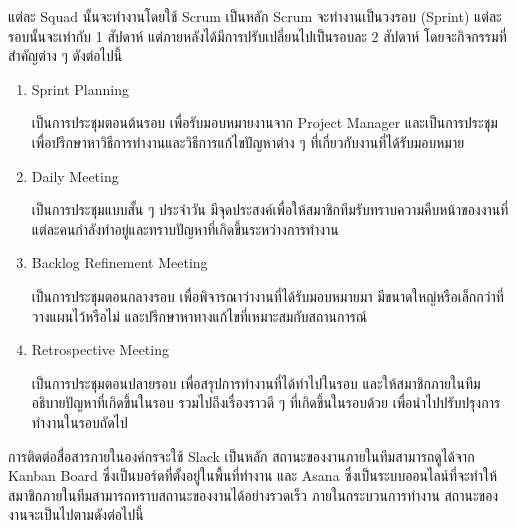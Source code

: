 แต่ละ Squad นั้นจะทำงานโดยใช้ Scrum เป็นหลัก Scrum จะทำงานเป็นวงรอบ (Sprint) แต่ละรอบนั้นจะเท่ากับ 1 สัปดาห์ แต่ภายหลังได้มีการปรับเปลี่ยนไปเป็นรอบละ 2 สัปดาห์ โดยจะกิจกรรมที่สำคัญต่าง ๆ ดังต่อไปนี้
\begin{enumerate}
	\item Sprint Planning
	
	เป็นการประชุมตอนต้นรอบ เพื่อรับมอบหมายงานจาก Project Manager และเป็นการประชุมเพื่อปรึกษาหาวิธีการทำงานและวิธีการแก้ไขปัญหาต่าง ๆ ที่เกี่ยวกับงานที่ได้รับมอบหมาย
	
	\item Daily Meeting
	
	เป็นการประชุมแบบสั้น ๆ ประจำวัน มีจุดประสงค์เพื่อให้สมาชิกทีมรับทราบความคืบหน้าของงานที่แต่ละคนกำลังทำอยู่และทราบปัญหาที่เกิดขึ้นระหว่างการทำงาน
	
	\item Backlog Refinement Meeting
	
	เป็นการประชุมตอนกลางรอบ เพื่อพิจารณาว่างานที่ได้รับมอบหมายมา มีขนาดใหญ่หรือเล็กกว่าที่วางแผนไว้หรือไม่ และปรึกษาหาทางแก้ไขที่เหมาะสมกับสถานการณ์
	
	\item Retrospective Meeting
	
	เป็นการประชุมตอนปลายรอบ เพื่อสรุปการทำงานที่ได้ทำไปในรอบ และให้สมาชิกภายในทีมอธิบายปัญหาที่เกิดขึ้นในรอบ รวมไปถึงเรื่องราวดี ๆ ที่เกิดขึ้นในรอบด้วย เพื่อนำไปปรับปรุงการทำงานในรอบถัดไป
\end{enumerate}

การติดต่อสื่อสารภายในองค์กรจะใช้ Slack เป็นหลัก สถานะของงานภายในทีมสามารถดูได้จาก Kanban Board ซึ่งเป็นบอร์ดที่ตั้งอยู่ในพื้นที่ทำงาน และ Asana ซึ่งเป็นระบบออนไลน์ที่จะทำให้สมาชิกภายในทีมสามารถทราบสถานะของงานได้อย่างรวดเร็ว ภายในกระบวนการทำงาน สถานะของงานจะเป็นไปตามดังต่อไปนี้

